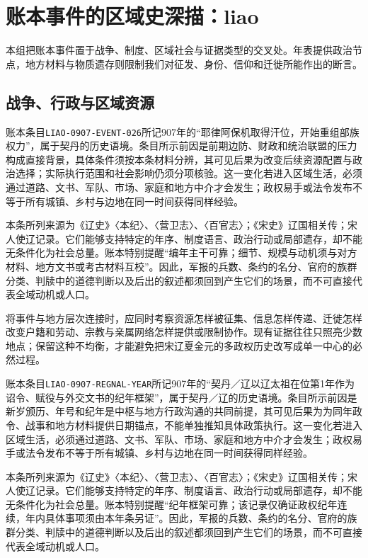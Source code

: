 \section{账本事件的区域史深描：liao}

\label{sec:ledger-depth-liao}

本组把账本事件置于战争、制度、区域社会与证据类型的交叉处。年表提供政治节点，地方材料与物质遗存则限制我们对征发、身份、信仰和迁徙所能作出的断言。

\subsection{战争、行政与区域资源}

账本条目\texttt{LIAO-0907-EVENT-026}所记907年的“耶律阿保机取得汗位，开始重组部族权力”，属于契丹的历史语境。条目所示前因是前期边防、财政和统治联盟的压力构成直接背景，具体条件须按本条材料分辨，其可见后果为改变后续资源配置与政治选择；实际执行范围和社会影响仍须分项核验。这一变化若进入区域生活，必须通过道路、文书、军队、市场、家庭和地方中介才会发生；政权易手或法令发布不等于所有城镇、乡村与边地在同一时间获得同样经验。

本条所列来源为《辽史》〈本纪〉、〈营卫志〉、〈百官志〉；《宋史》辽国相关传；宋人使辽记录。它们能够支持特定的年序、制度语言、政治行动或局部遗存，却不能无条件化为社会总量。账本特别提醒“编年主干可靠；细节、规模与动机须与对方材料、地方文书或考古材料互校”。因此，军报的兵数、条约的名分、官府的族群分类、判牍中的道德判断以及后出的叙述都须回到产生它们的场景，而不可直接代表全域动机或人口。

将事件与地方层次连接时，应同时考察资源怎样被征集、信息怎样传递、迁徙怎样改变户籍和劳动、宗教与亲属网络怎样提供或限制协作。现有证据往往只照亮少数地点；保留这种不均衡，才能避免把宋辽夏金元的多政权历史改写成单一中心的必然过程。

账本条目\texttt{LIAO-0907-REGNAL-YEAR}所记907年的“契丹／辽以辽太祖在位第1年作为诏令、赋役与外交文书的纪年框架”，属于契丹／辽的历史语境。条目所示前因是新岁颁历、年号和纪年是中枢与地方行政沟通的共同前提，其可见后果为为同年政令、战事和地方材料提供日期锚点，不能单独推知具体政策执行。这一变化若进入区域生活，必须通过道路、文书、军队、市场、家庭和地方中介才会发生；政权易手或法令发布不等于所有城镇、乡村与边地在同一时间获得同样经验。

本条所列来源为《辽史》〈本纪〉、〈营卫志〉、〈百官志〉；《宋史》辽国相关传；宋人使辽记录。它们能够支持特定的年序、制度语言、政治行动或局部遗存，却不能无条件化为社会总量。账本特别提醒“纪年框架可靠；该记录仅确证政权纪年连续，年内具体事项须由本年条另证”。因此，军报的兵数、条约的名分、官府的族群分类、判牍中的道德判断以及后出的叙述都须回到产生它们的场景，而不可直接代表全域动机或人口。

